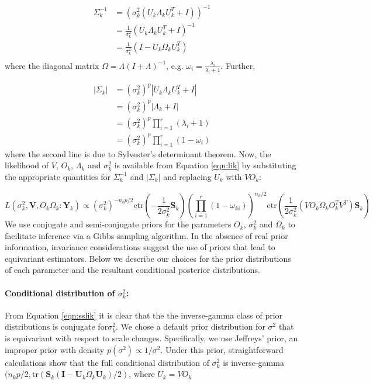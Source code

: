 \documentclass{article}
\newcommand{\bl}[1]{{\mathbf #1}}
\newcommand{\tr}{\text{tr}}
\newcommand{\etr}{\text{etr}}
\begin{document}
\begin{align}
\Sigma^{-1}_k &=  (\sigma_k^2(U_k\Lambda_kU_k^T+I))^{-1}\\
&= \frac{1}{\sigma_k^2}(U_k\Lambda_kU_k^T+I)^{-1}\\
&= \frac{1}{\sigma_k^2}(I-U_k\Omega_kU_k^T)\\
\end{align}
%
\noindent where the diagonal matrix $\Omega = \Lambda(I+\Lambda)^{-1}$, e.g. $\omega_i = \frac{\lambda_i}{\lambda_{i}+1}$.  Further, 

\begin{align}
|\Sigma_k| &= (\sigma_k^2)^{p}|U_k\Lambda_kU_k^T+I|\\
&= (\sigma_k^2)^{p}|\Lambda_k+I| \\
&= (\sigma_k^2)^{p}\prod_{i=1}^r(\lambda_i+1)\\
&= (\sigma_k^2)^{p}\prod_{i=1}^r(1-\omega_i)
\end{align}
%
\noindent where the second line is due to Sylvester's determinant
theorem.  Now, the likelihood of $V$, $O_k$, $\Lambda_k$ and
$\sigma_k^2$ is available from Equation \ref{eqn:lik} by substituting
the appropriate quantities for $\Sigma^{-1}_k$ and $|\Sigma_k|$ and
replacing $U_k$ with $VO_k$:

\begin{equation}
 L(\sigma_k^2,\bl V , O_k \Omega_k : \bl Y_k) \propto
    (\sigma_k^2)^{-n_kp/2}\etr(-\frac{1}{2\sigma_k^2}\mathbf{S}_k)\left(\prod_{i=1}^r(1-\omega_{ki})
   \right) ^{n_k/2}
   \etr(\frac{1}{2\sigma_k^2}(VO_k\Omega_kO_k^TV^T)\mathbf{S}_k)
\label{eqn:sslik}
\end{equation}
%
\noindent We use conjugate and semi-conjugate priors for the parameters $O_k$,
$\sigma^2_k$ and $\Omega_k$ to facilitate inference via a Gibbs
sampling algorithm.  In the absence of real prior information,
invariance considerations suggest the use of priors that lead to
equivariant estimators.  Below we describe our choices for the prior
distributions of each parameter and the resultant conditional posterior
distributions.

\paragraph{Conditional distribution of $\sigma_k^2$:}

From Equation \ref{eqn:sslik} it is clear that the the inverse-gamma
class of prior distributions is conjugate for$\sigma_k^2$.  We chose a
default prior distribution for $\sigma^2$ that is equivariant with
respect to scale changes.  Specifically, we use Jeffreys' prior, an
improper prior with density $p(\sigma^2) \propto 1/\sigma^2 $.  Under
this prior, straightforward calculations show that the full
conditional distribution of $\sigma_k^2$ is
inverse-gamma$( n_k p/2 , \tr(\bl S_k(\bl I -\bl U_k\Omega_k\bl
U_k)/2)$, where $U_k = VO_k$
\end{document}
